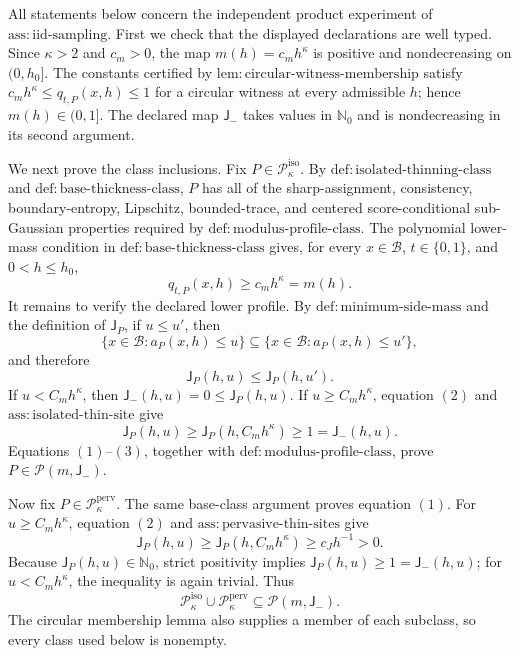 All statements below concern the independent product experiment of \(\mathrm{ass:iid\text{-}sampling}\).  First we check that the displayed declarations are well typed.  Since \(\kappa>2\) and \(c_m>0\), the map \(m(h)=c_mh^\kappa\) is positive and nondecreasing on \((0,h_0]\).  The constants certified by \(\mathrm{lem:circular\text{-}witness\text{-}membership}\) satisfy \(c_mh^\kappa\le q_{t,P}(x,h)\le1\) for a circular witness at every admissible \(h\); hence \(m(h)\in(0,1]\).  The declared map \(\mathsf J_-\) takes values in \(\mathbb N_0\) and is nondecreasing in its second argument.

We next prove the class inclusions.  Fix \(P\in\mathcal P_\kappa^{\mathrm{iso}}\).  By \(\mathrm{def:isolated\text{-}thinning\text{-}class}\) and \(\mathrm{def:base\text{-}thickness\text{-}class}\), \(P\) has all of the sharp-assignment, consistency, boundary-entropy, Lipschitz, bounded-trace, and centered score-conditional sub-Gaussian properties required by \(\mathrm{def:modulus\text{-}profile\text{-}class}\).  The polynomial lower-mass condition in \(\mathrm{def:base\text{-}thickness\text{-}class}\) gives, for every \(x\in\mathcal B\), \(t\in\{0,1\}\), and \(0<h\le h_0\),
\[
 q_{t,P}(x,h)\ge c_mh^\kappa=m(h). \tag{1}
\]
It remains to verify the declared lower profile.  By \(\mathrm{def:minimum\text{-}side\text{-}mass}\) and the definition of \(\mathsf J_P\), if \(u\le u'\), then
\[
 \{x\in\mathcal B:a_P(x,h)\le u\}
 \subseteq
 \{x\in\mathcal B:a_P(x,h)\le u'\},
\]
and therefore
\[
 \mathsf J_P(h,u)\le\mathsf J_P(h,u'). \tag{2}
\]
If \(u<C_mh^\kappa\), then \(\mathsf J_-(h,u)=0\le\mathsf J_P(h,u)\).  If \(u\ge C_mh^\kappa\), equation \((2)\) and \(\mathrm{ass:isolated\text{-}thin\text{-}site}\) give
\[
 \mathsf J_P(h,u)
 \ge \mathsf J_P(h,C_mh^\kappa)
 \ge1
 =\mathsf J_-(h,u). \tag{3}
\]
Equations \((1)\)--\((3)\), together with \(\mathrm{def:modulus\text{-}profile\text{-}class}\), prove \(P\in\mathcal P(m,\mathsf J_-)\).

Now fix \(P\in\mathcal P_\kappa^{\mathrm{perv}}\).  The same base-class argument proves equation \((1)\).  For \(u\ge C_mh^\kappa\), equation \((2)\) and \(\mathrm{ass:pervasive\text{-}thin\text{-}sites}\) give
\[
 \mathsf J_P(h,u)
 \ge \mathsf J_P(h,C_mh^\kappa)
 \ge c_Jh^{-1}>0.
\]
Because \(\mathsf J_P(h,u)\in\mathbb N_0\), strict positivity implies \(\mathsf J_P(h,u)\ge1=\mathsf J_-(h,u)\); for \(u<C_mh^\kappa\), the inequality is again trivial.  Thus
\[
 \mathcal P_\kappa^{\mathrm{iso}}\cup
 \mathcal P_\kappa^{\mathrm{perv}}
 \subseteq \mathcal P(m,\mathsf J_-). \tag{4}
\]
The circular membership lemma also supplies a member of each subclass, so every class used below is nonempty.

